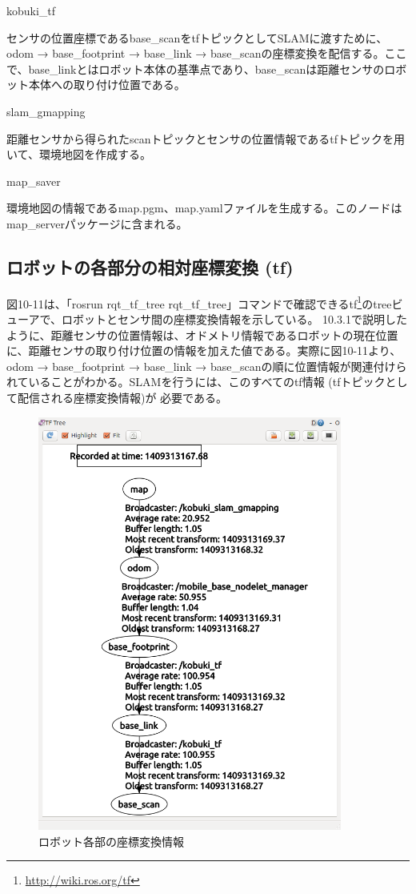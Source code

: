 \circled{\thenum} kobuki\_tf

センサの位置座標であるbase\_scanをtfトピックとしてSLAMに渡すために、odom → base\_footprint → base\_link → base\_scanの座標変換を配信する。ここで、base\_linkとはロボット本体の基準点であり、base\_scanは距離センサのロボット本体への取り付け位置である。

\circled{\thenum} slam\_gmapping

距離センサから得られたscanトピックとセンサの位置情報であるtfトピックを用いて、環境地図を作成する。

\circled{\thenum} map\_saver

環境地図の情報であるmap.pgm、map.yamlファイルを生成する。このノードはmap\_serverパッケージに含まれる。

\subsection{ロボットの各部分の相対座標変換 (tf)}

図10-11は、「rosrun rqt\_tf\_tree rqt\_tf\_tree」コマンドで確認できるtf\footnote{\url{http://wiki.ros.org/tf}}のtreeビューアで、ロボットとセンサ間の座標変換情報を示している。
10.3.1で説明したように、距離センサの位置情報は、オドメトリ情報であるロボットの現在位置に、距離センサの取り付け位置の情報を加えた値である。実際に図10-11より、odom → base\_footprint → base\_link → base\_scanの順に位置情報が関連付けられていることがわかる。SLAMを行うには、このすべてのtf情報 (tfトピックとして配信される座標変換情報)が  必要である。

\begin{figure}[htp]
  \centering
  \includegraphics[width=10cm]{pictures/chapter10/pic_10_11.png}
  \caption{ロボット各部の座標変換情報}
\end{figure}

